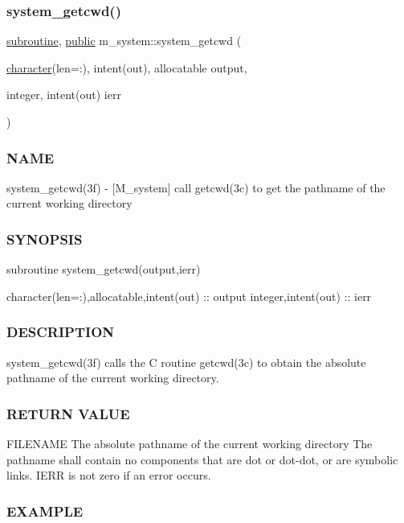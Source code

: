 \subsubsection{\texorpdfstring{system\+\_\+getcwd()}{system\_getcwd()}}
{\footnotesize\ttfamily \hyperlink{M__stopwatch_83_8txt_acfbcff50169d691ff02d4a123ed70482}{subroutine}, \hyperlink{M__stopwatch_83_8txt_a2f74811300c361e53b430611a7d1769f}{public} m\+\_\+system\+::system\+\_\+getcwd (\begin{DoxyParamCaption}\item[{\hyperlink{option__stopwatch_83_8txt_abd4b21fbbd175834027b5224bfe97e66}{character}(len=\+:), intent(out), allocatable}]{output,  }\item[{integer, intent(out)}]{ierr }\end{DoxyParamCaption})}



\subsubsection*{N\+A\+ME}

system\+\_\+getcwd(3f) -\/ \mbox{[}M\+\_\+system\mbox{]} call getcwd(3c) to get the pathname of the current working directory \subsubsection*{S\+Y\+N\+O\+P\+S\+IS}

subroutine system\+\_\+getcwd(output,ierr)

character(len=\+:),allocatable,intent(out) \+:\+: output integer,intent(out) \+:\+: ierr \subsubsection*{D\+E\+S\+C\+R\+I\+P\+T\+I\+ON}

system\+\_\+getcwd(3f) calls the C routine getcwd(3c) to obtain the absolute pathname of the current working directory.

\subsubsection*{R\+E\+T\+U\+RN V\+A\+L\+UE}

F\+I\+L\+E\+N\+A\+ME The absolute pathname of the current working directory The pathname shall contain no components that are dot or dot-\/dot, or are symbolic links. I\+E\+RR is not zero if an error occurs.

\subsubsection*{E\+X\+A\+M\+P\+LE}

